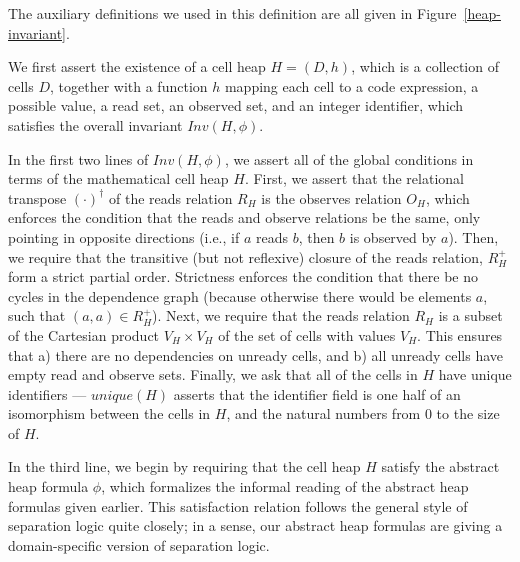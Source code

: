 
The auxiliary definitions we used in this definition are all given in
Figure~\ref{heap-invariant}. 

We first assert the existence of a cell heap $H = (D,h)$, which is a
collection of cells $D$, together with a function $h$ mapping each
cell to a code expression, a possible value, a read set, an observed
set, and an integer identifier, which satisfies the overall invariant
$Inv(H, \phi)$.



In the first two lines of $Inv(H, \phi)$, we assert all of the global 
conditions in terms of the mathematical cell heap $H$. First, we assert that 
the relational transpose $(\cdot)^\dagger$ of the reads relation $R_H$ is the
observes relation $O_H$, which enforces the condition that the reads
and observe relations be the same, only pointing in opposite
directions (i.e., if $a$ reads $b$, then $b$ is observed by
$a$). Then, we require that the transitive (but not reflexive) closure
of the reads relation, $R^+_H$ form a strict partial order. Strictness
enforces the condition that there be no cycles in the dependence graph
(because otherwise there would be elements $a$, such that $(a, a) \in
R^+_H$).  Next, we require that the reads relation $R_H$ is a subset of
the Cartesian product $V_H \times V_H$ of the set of cells with values
$V_H$. This ensures that a) there are no dependencies on unready
cells, and b) all unready cells have empty read and observe
sets. Finally, we ask that all of the cells in $H$ have unique
identifiers --- $unique(H)$ asserts that the identifier field is one
half of an isomorphism between the cells in $H$, and the natural
numbers from 0 to the size of $H$.

In the third line, we begin by requiring that the cell heap $H$ satisfy
the abstract heap formula $\phi$, which formalizes the informal
reading of the abstract heap formulas given earlier. This satisfaction
relation follows the general style of separation logic quite closely; 
in a sense, our abstract heap formulas are giving a domain-specific
version of separation logic.

